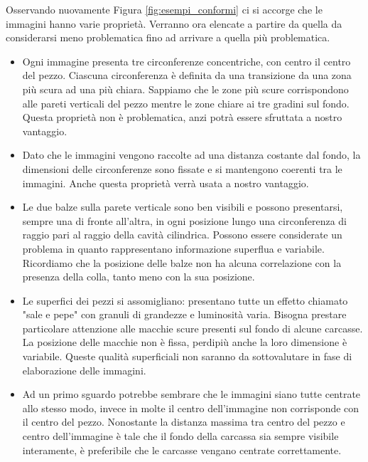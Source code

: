 Osservando nuovamente Figura \ref{fig:esempi_conformi} ci si accorge che le immagini hanno varie proprietà.
Verranno ora elencate a partire da quella da considerarsi meno problematica fino ad arrivare a quella più problematica.
\begin{itemize}

  \item Ogni immagine presenta tre circonferenze concentriche, con centro il centro del pezzo.
    Ciascuna circonferenza è definita da una transizione da una zona più scura ad una più chiara.
    Sappiamo che le zone più scure corrispondono alle pareti verticali del pezzo mentre le zone chiare ai tre gradini sul fondo.
    Questa proprietà non è problematica, anzi potrà essere sfruttata a nostro vantaggio.

  \item Dato che le immagini vengono raccolte ad una distanza costante dal fondo, la dimensioni delle circonferenze sono fissate e si mantengono coerenti tra le immagini. Anche questa proprietà verrà usata a nostro vantaggio.

  \item Le due balze sulla parete verticale sono ben visibili e possono presentarsi, sempre una di fronte all'altra, in ogni posizione lungo una circonferenza di raggio pari al raggio della cavità cilindrica.
    Possono essere considerate un problema in quanto rappresentano informazione superflua e variabile.
    Ricordiamo che la posizione delle balze non ha alcuna correlazione con la presenza della colla, tanto meno con la sua posizione.

  \item Le superfici dei pezzi si assomigliano: presentano tutte un effetto chiamato "sale e pepe" con granuli di grandezze e luminosità varia.
    Bisogna prestare particolare attenzione alle macchie scure presenti sul fondo di alcune carcasse.
    La posizione delle macchie non è fissa, perdipiù anche la loro dimensione è variabile.
    Queste qualità superficiali non saranno da sottovalutare in fase di elaborazione delle immagini.

  \item Ad un primo sguardo potrebbe sembrare che le immagini siano tutte centrate allo stesso modo, invece in molte il centro dell'immagine non corrisponde con il centro del pezzo.
    Nonostante la distanza massima tra centro del pezzo e centro dell'immagine è tale che il fondo della carcassa sia sempre visibile interamente, è preferibile che le carcasse vengano centrate correttamente.
  

\end{itemize}
